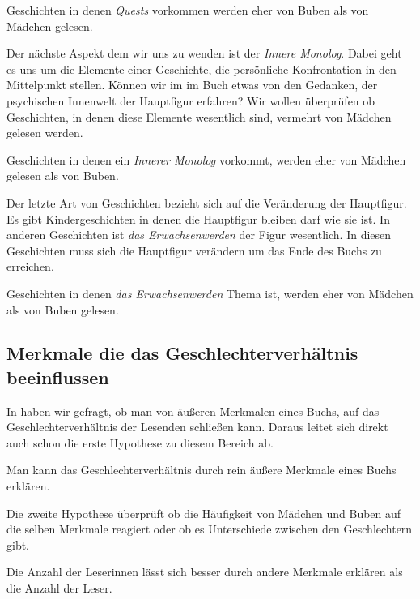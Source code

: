 \begin{subhyp}\label{h4.2}
    Geschichten in denen \emph{Quests} vorkommen werden eher von Buben als von Mädchen gelesen.
\end{subhyp}

Der nächste Aspekt dem wir uns zu wenden ist der \emph{Innere Monolog}.
Dabei geht es uns um die Elemente einer Geschichte, die persönliche
Konfrontation in den Mittelpunkt stellen. Können wir im im Buch etwas
von den Gedanken, der psychischen Innenwelt der Hauptfigur erfahren? Wir
wollen überprüfen ob Geschichten, in denen diese Elemente wesentlich
sind, vermehrt von Mädchen gelesen werden.

\begin{subhyp}\label{h4.3}
   Geschichten in denen ein \emph{Innerer Monolog} vorkommt, werden eher von Mädchen gelesen als von Buben.
\end{subhyp}

Der letzte Art von Geschichten bezieht sich auf die Veränderung der
Hauptfigur. Es gibt Kindergeschichten in denen die Hauptfigur bleiben
darf wie sie ist. In anderen Geschichten ist \emph{das Erwachsenwerden}
der Figur wesentlich. In diesen Geschichten muss sich die Hauptfigur
verändern um das Ende des Buchs zu erreichen.

\begin{subhyp}\label{h4.4}
   Geschichten in denen \emph{das Erwachsenwerden} Thema ist,
   werden eher von Mädchen als von Buben gelesen.
\end{subhyp}

\subsection{Merkmale die das Geschlechterverhältnis beeinflussen}

In  haben wir gefragt, ob man von äußeren Merkmalen
eines Buchs, auf das Geschlechterverhältnis der Lesenden schließen kann.
Daraus leitet sich direkt auch schon die erste Hypothese zu diesem
Bereich ab.

\begin{hyp}\label{h5}
    Man kann das Geschlechterverhältnis durch rein äußere Merkmale eines Buchs erklären.
\end{hyp}

Die zweite Hypothese überprüft ob die Häufigkeit von Mädchen und Buben
auf die selben Merkmale reagiert oder ob es Unterschiede zwischen den
Geschlechtern gibt.

\begin{subhyp}\label{h5.1}
    Die Anzahl der Leserinnen lässt sich besser durch andere Merkmale erklären als die Anzahl der Leser.
\end{subhyp}

